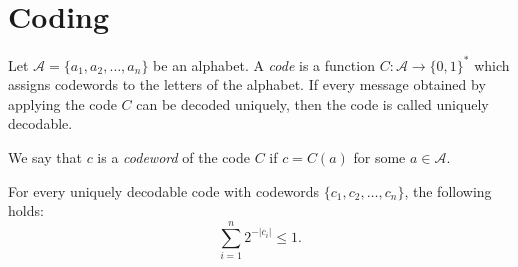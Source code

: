 
\section{Coding}

\begin{definition}
    Let $\mathcal{A} = \{ a_{1}, a_{2}, \dots, a_{n} \}$ be an alphabet.
    A \emph{code} is a function $C: \mathcal{A} \to \{ 0, 1 \}^{\ast}$ which assigns codewords to the letters of the alphabet.
    If every message obtained by applying the code $C$ can be decoded uniquely, then the code is called uniquely decodable.
\end{definition}

We say that $c$ is a \emph{codeword} of the code $C$ if $c = C(a)$ for some $a \in \mathcal{A}$.

\begin{theorem} 
    \label{thm:Kraft-McMillan}
    For every uniquely decodable code with codewords $\{ c_{1}, c_{2}, \dots, c_{n} \}$, the following holds:
    \[
        \sum _{ i = 1 }^{ n } 2^{-|c_{i}|} \le 1.
    \]
\end{theorem}

